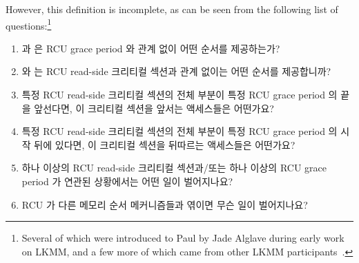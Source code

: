 However, this definition is incomplete, as can be seen from the following
list of questions:\footnote{
	Several of which were introduced to Paul by Jade Alglave during
	early work on LKMM, and a few more of which came from other
	LKMM participants~\cite{Alglave:2018:FSC:3173162.3177156}.}
\fi

\begin{enumerate}
\item	{} 과  은 RCU grace period 와
	관계 없이 어떤 순서를 제공하는가?
\item	{} 와  는 RCU
	read-side 크리티컬 섹션과 관계 없이는 어떤 순서를 제공합니까?
\item	특정 RCU read-side 크리티컬 섹션의 전체 부분이 특정 RCU grace period 의
	끝을 앞선다면, 이 크리티컬 섹션을 앞서는 액세스들은 어떤가요?
\item	특정 RCU read-side 크리티컬 섹션의 전체 부분이 특정 RCU grace period 의 
	시작 뒤에 있다면, 이 크리티컬 섹션을 뒤따르는 액세스들은 어떤가요?

\item	하나 이상의 RCU read-side 크리티컬 섹션과/또는 하나 이상의 RCU grace
	period 가 연관된 상황에서는 어떤 일이 벌어지나요?
\item	RCU 가 다른 메모리 순서 메커니즘들과 엮이면 무슨 일이 벌어지나요?

\end{enumerate}

